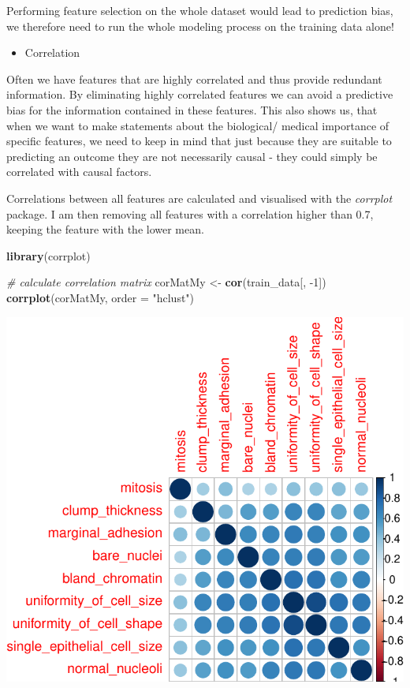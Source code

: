 \documentclass[]{article}
\newenvironment{Shaded}{\begin{snugshade}}{\end{snugshade}}
\newcommand{\KeywordTok}[1]{\textcolor[rgb]{0.13,0.29,0.53}{\textbf{{#1}}}}
\newcommand{\DataTypeTok}[1]{\textcolor[rgb]{0.13,0.29,0.53}{{#1}}}
\newcommand{\DecValTok}[1]{\textcolor[rgb]{0.00,0.00,0.81}{{#1}}}
\newcommand{\StringTok}[1]{\textcolor[rgb]{0.31,0.60,0.02}{{#1}}}
\newcommand{\CommentTok}[1]{\textcolor[rgb]{0.56,0.35,0.01}{\textit{{#1}}}}
\newcommand{\NormalTok}[1]{{#1}}
\providecommand{\tightlist}{%
  \setlength{\itemsep}{0pt}\setlength{\parskip}{0pt}}
\begin{document}
Performing feature selection on the whole dataset would lead to
prediction bias, we therefore need to run the whole modeling process on
the training data alone!

\begin{itemize}
\tightlist
\item
  Correlation
\end{itemize}

Often we have features that are highly correlated and thus provide
redundant information. By eliminating highly correlated features we can
avoid a predictive bias for the information contained in these features.
This also shows us, that when we want to make statements about the
biological/ medical importance of specific features, we need to keep in
mind that just because they are suitable to predicting an outcome they
are not necessarily causal - they could simply be correlated with causal
factors.

Correlations between all features are calculated and visualised with the
\emph{corrplot} package. I am then removing all features with a
correlation higher than 0.7, keeping the feature with the lower mean.

\begin{Shaded}
\begin{Highlighting}[]
\KeywordTok{library}\NormalTok{(corrplot)}

\CommentTok{# calculate correlation matrix}
\NormalTok{corMatMy <-}\StringTok{ }\KeywordTok{cor}\NormalTok{(train_data[, -}\DecValTok{1}\NormalTok{])}
\KeywordTok{corrplot}\NormalTok{(corMatMy, }\DataTypeTok{order =} \StringTok{"hclust"}\NormalTok{)}
\end{Highlighting}
\end{Shaded}

\includegraphics{webinar_code_files/figure-latex/unnamed-chunk-24-1.pdf}
\end{document}
